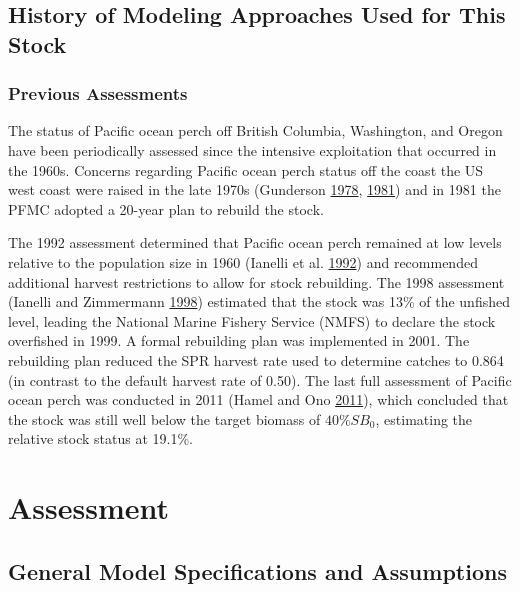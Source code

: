 \documentclass[12pt,]{article}
\begin{document}
\subsection{History of Modeling Approaches Used for This
Stock}\label{history-of-modeling-approaches-used-for-this-stock}

\subsubsection{Previous Assessments}\label{previous-assessments}

The status of Pacific ocean perch off British Columbia, Washington, and
Oregon have been periodically assessed since the intensive exploitation
that occurred in the 1960s. Concerns regarding Pacific ocean perch
status off the coast the US west coast were raised in the late 1970s
(Gunderson \protect\hyperlink{ref-gunderson_results_1978}{1978},
\protect\hyperlink{ref-gunderson_updated_1981}{1981}) and in 1981 the
PFMC adopted a 20-year plan to rebuild the stock.

The 1992 assessment determined that Pacific ocean perch remained at low
levels relative to the population size in 1960 (Ianelli et al.
\protect\hyperlink{ref-ianelli_status_1992}{1992}) and recommended
additional harvest restrictions to allow for stock rebuilding. The 1998
assessment (Ianelli and Zimmermann
\protect\hyperlink{ref-ianelli_status_1998}{1998}) estimated that the
stock was 13\% of the unfished level, leading the National Marine
Fishery Service (NMFS) to declare the stock overfished in 1999. A formal
rebuilding plan was implemented in 2001. The rebuilding plan reduced the
SPR harvest rate used to determine catches to 0.864 (in contrast to the
default harvest rate of 0.50). The last full assessment of Pacific ocean
perch was conducted in 2011 (Hamel and Ono
\protect\hyperlink{ref-hamel_stock_2011}{2011}), which concluded that
the stock was still well below the target biomass of \(40\%SB_{0}\),
estimating the relative stock status at 19.1\%.

\section{Assessment}\label{assessment}

\subsection{General Model Specifications and
Assumptions}\label{general-model-specifications-and-assumptions}
\end{document}
